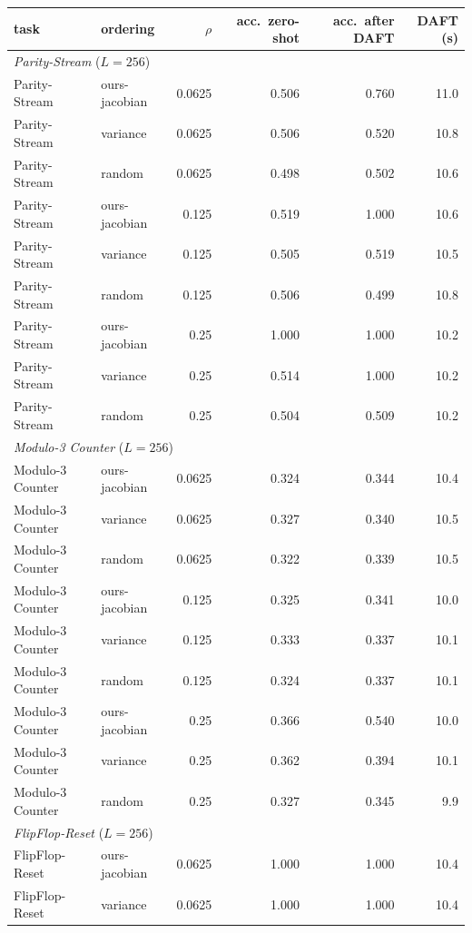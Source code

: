 \begin{tabular}{llrrrr}
\toprule
task & ordering & $\rho$ & acc.\ zero-shot & acc.\ after DAFT & DAFT (s) \\
\midrule
\midrule
\multicolumn{6}{l}{\emph{Parity-Stream} ($L=256$)} $\quad$ full CfC: \textbf{1.000} \\
Parity-Stream & ours-jacobian & 0.0625 & 0.506 & 0.760 & 11.0 \\
Parity-Stream & variance & 0.0625 & 0.506 & 0.520 & 10.8 \\
Parity-Stream & random & 0.0625 & 0.498 & 0.502 & 10.6 \\
Parity-Stream & ours-jacobian & 0.125 & 0.519 & 1.000 & 10.6 \\
Parity-Stream & variance & 0.125 & 0.505 & 0.519 & 10.5 \\
Parity-Stream & random & 0.125 & 0.506 & 0.499 & 10.8 \\
Parity-Stream & ours-jacobian & 0.25 & 1.000 & 1.000 & 10.2 \\
Parity-Stream & variance & 0.25 & 0.514 & 1.000 & 10.2 \\
Parity-Stream & random & 0.25 & 0.504 & 0.509 & 10.2 \\
\midrule
\multicolumn{6}{l}{\emph{Modulo-3 Counter} ($L=256$)} $\quad$ full CfC: \textbf{1.000} \\
Modulo-3 Counter & ours-jacobian & 0.0625 & 0.324 & 0.344 & 10.4 \\
Modulo-3 Counter & variance & 0.0625 & 0.327 & 0.340 & 10.5 \\
Modulo-3 Counter & random & 0.0625 & 0.322 & 0.339 & 10.5 \\
Modulo-3 Counter & ours-jacobian & 0.125 & 0.325 & 0.341 & 10.0 \\
Modulo-3 Counter & variance & 0.125 & 0.333 & 0.337 & 10.1 \\
Modulo-3 Counter & random & 0.125 & 0.324 & 0.337 & 10.1 \\
Modulo-3 Counter & ours-jacobian & 0.25 & 0.366 & 0.540 & 10.0 \\
Modulo-3 Counter & variance & 0.25 & 0.362 & 0.394 & 10.1 \\
Modulo-3 Counter & random & 0.25 & 0.327 & 0.345 & 9.9 \\
\midrule
\multicolumn{6}{l}{\emph{FlipFlop-Reset} ($L=256$)} $\quad$ full CfC: \textbf{1.000} \\
FlipFlop-Reset & ours-jacobian & 0.0625 & 1.000 & 1.000 & 10.4 \\
FlipFlop-Reset & variance & 0.0625 & 1.000 & 1.000 & 10.4 \\

\end{tabular}
